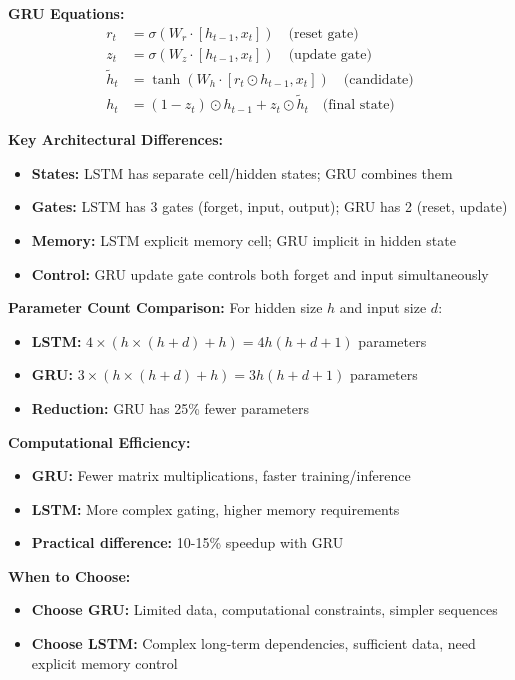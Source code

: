 \documentclass[12pt]{article}
\begin{document}
\begin{enumerate}[(a)]
{    \textbf{GRU Equations:}
    \begin{align}
        r_t &= \sigma(W_r \cdot [h_{t-1}, x_t]) \quad \text{(reset gate)} \\
        z_t &= \sigma(W_z \cdot [h_{t-1}, x_t]) \quad \text{(update gate)} \\
        \tilde{h}_t &= \tanh(W_h \cdot [r_t \odot h_{t-1}, x_t]) \quad \text{(candidate)} \\
        h_t &= (1-z_t) \odot h_{t-1} + z_t \odot \tilde{h}_t \quad \text{(final state)}
    \end{align}
    
    \textbf{Key Architectural Differences:}
    \begin{itemize}
        \item \textbf{States:} LSTM has separate cell/hidden states; GRU combines them
        \item \textbf{Gates:} LSTM has 3 gates (forget, input, output); GRU has 2 (reset, update)
        \item \textbf{Memory:} LSTM explicit memory cell; GRU implicit in hidden state
        \item \textbf{Control:} GRU update gate controls both forget and input simultaneously
    \end{itemize}
    
    \textbf{Parameter Count Comparison:}
    For hidden size $h$ and input size $d$:
    \begin{itemize}
        \item \textbf{LSTM:} $4 \times (h \times (h + d) + h) = 4h(h + d + 1)$ parameters
        \item \textbf{GRU:} $3 \times (h \times (h + d) + h) = 3h(h + d + 1)$ parameters
        \item \textbf{Reduction:} GRU has 25\% fewer parameters
    \end{itemize}
    
    \textbf{Computational Efficiency:}
    \begin{itemize}
        \item \textbf{GRU:} Fewer matrix multiplications, faster training/inference
        \item \textbf{LSTM:} More complex gating, higher memory requirements
        \item \textbf{Practical difference:} 10-15\% speedup with GRU
    \end{itemize}
    
    \textbf{When to Choose:}
    \begin{itemize}
        \item \textbf{Choose GRU:} Limited data, computational constraints, simpler sequences
        \item \textbf{Choose LSTM:} Complex long-term dependencies, sufficient data, need explicit memory control
    \end{itemize}
    }
    

\end{enumerate}
\end{document}
